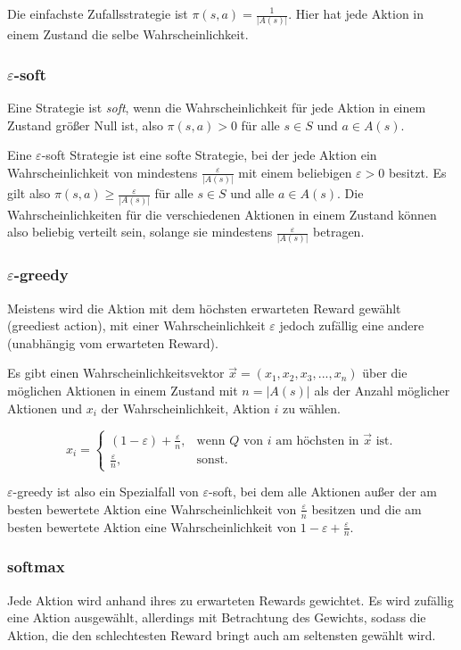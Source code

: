 \documentclass[10pt]{scrartcl}
\begin{document}
Die einfachste Zufallsstrategie ist $\pi(s, a) = \frac{1}{|A(s)|}$. Hier hat jede Aktion in einem Zustand die selbe Wahrscheinlichkeit.

\subsubsection{$\varepsilon$-soft}
Eine Strategie ist \emph{soft}, wenn die Wahrscheinlichkeit für jede Aktion in einem Zustand größer Null ist, also $\pi(s, a) > 0$ für alle $s \in S$ und $a \in A(s)$.

Eine $\varepsilon$-soft Strategie ist eine softe Strategie, bei der jede Aktion ein Wahrscheinlichkeit von mindestens $\frac{\varepsilon}{|A(s)|}$ mit einem beliebigen $\varepsilon > 0$ besitzt. Es gilt also $\pi(s, a) \ge \frac{\varepsilon}{|A(s)|}$ für alle $s \in S$ und alle $a \in A(s)$. Die Wahrscheinlichkeiten für die verschiedenen Aktionen in einem Zustand können also beliebig verteilt sein, solange sie mindestens $\frac{\varepsilon}{|A(s)|}$ betragen.

\subsubsection{$\varepsilon$-greedy}
Meistens wird die Aktion mit dem höchsten erwarteten Reward gewählt (greediest action), mit einer Wahrscheinlichkeit $\varepsilon$ jedoch zufällig eine andere (unabhängig vom erwarteten Reward).

Es gibt einen Wahrscheinlichkeitsvektor $\vec x = (x_1, x_2, x_3, ..., x_n)$ über die möglichen Aktionen in einem Zustand mit $n = |A(s)|$ als der Anzahl möglicher Aktionen und $x_i$ der Wahrscheinlichkeit, Aktion $i$ zu wählen.

\[
x_i=\begin{cases}
  (1-\varepsilon) + \frac{\varepsilon}{n}, & \text{wenn }Q\text{ von }i\text{ am höchsten in }\vec x\text{ ist.}\\
  \frac{\varepsilon}{n}, & \text{sonst.}
\end{cases}
\]

$\varepsilon$-greedy ist also ein Spezialfall von $\varepsilon$-soft, bei dem alle Aktionen außer der am besten bewertete Aktion eine Wahrscheinlichkeit von $\frac{\varepsilon}{n}$ besitzen und die am besten bewertete Aktion eine Wahrscheinlichkeit von $1 - \varepsilon + \frac{\varepsilon}{n}$.

\subsubsection{softmax}
Jede Aktion wird anhand ihres zu erwarteten Rewards gewichtet. Es wird zufällig eine Aktion ausgewählt, allerdings mit Betrachtung des Gewichts, sodass die Aktion, die den schlechtesten Reward bringt auch am seltensten gewählt wird. 
\end{document}
